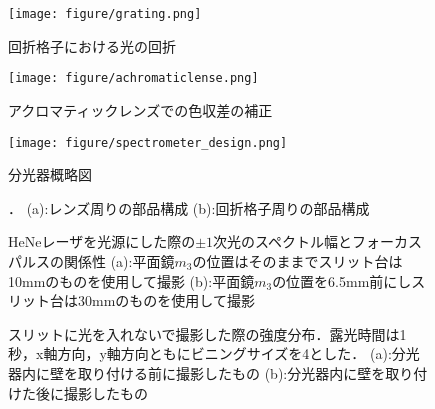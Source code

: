 \begin{figure}[htbp]
    \centering
    \texttt{[image: figure/grating.png]}
    \caption{回折格子における光の回折}
\end{figure}

\begin{figure}[htbp]
    \centering
    \texttt{[image: figure/achromaticlense.png]}
    \caption{アクロマティックレンズでの色収差の補正}
\end{figure}


\begin{figure}[htbp]
    \centering
    \texttt{[image: figure/spectrometer\_design.png]}
    \caption{分光器概略図}
\end{figure}


\begin{figure}
    \caption{．
    (a):レンズ周りの部品構成
    (b):回折格子周りの部品構成}
\end{figure}

\begin{figure}
    \caption{HeNeレーザを光源にした際の$\pm{1}$次光のスペクトル幅とフォーカスパルスの関係性
    (a):平面鏡$m_3$の位置はそのままでスリット台は10mmのものを使用して撮影
    (b):平面鏡$m_3$の位置を6.5mm前にしスリット台は30mmのものを使用して撮影}
\end{figure}


\begin{figure}
    \caption{スリットに光を入れないで撮影した際の強度分布．露光時間は1秒，x軸方向，y軸方向ともにビニングサイズを4とした．
    (a):分光器内に壁を取り付ける前に撮影したもの
    (b):分光器内に壁を取り付けた後に撮影したもの}
\end{figure}


